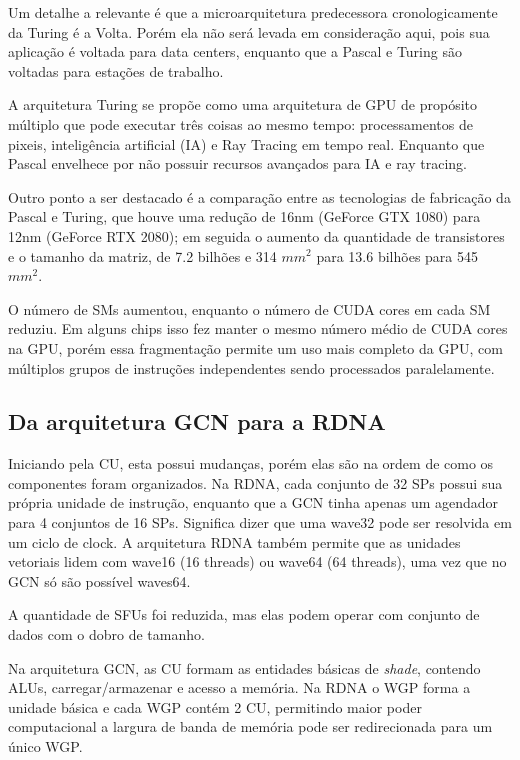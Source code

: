 \documentclass[letterpaper, 10 pt, conference]{ieeeconf}  %
\begin{document}
Um detalhe a relevante é que a microarquitetura predecessora cronologicamente da Turing é a Volta. Porém ela não será levada em consideração aqui, pois sua aplicação é voltada para data centers, enquanto que a Pascal e Turing são voltadas para estações de trabalho.

A arquitetura Turing se propõe como uma arquitetura de GPU de propósito múltiplo que pode executar três coisas ao mesmo tempo: processamentos de pixeis, inteligência artificial (IA) e Ray Tracing em tempo real. Enquanto que Pascal envelhece por não possuir recursos avançados para IA e ray tracing.

Outro ponto a ser destacado é a comparação entre as tecnologias de fabricação da Pascal e Turing, que houve uma redução de 16nm (GeForce GTX 1080) para 12nm (GeForce RTX 2080); em seguida o aumento da quantidade de transistores e o tamanho da matriz, de 7.2 bilhões e 314 $mm^2$ para 13.6 bilhões para 545 $mm^2$.

O número de SMs aumentou, enquanto o número de CUDA cores em cada SM reduziu. Em alguns chips isso fez manter o mesmo número médio de CUDA cores na GPU, porém essa fragmentação permite um uso mais completo da GPU, com múltiplos grupos de instruções independentes sendo processados paralelamente.


\subsection{Da arquitetura GCN para a RDNA}

Iniciando pela CU, esta possui mudanças, porém elas são na ordem de como os componentes foram organizados. Na RDNA, cada conjunto de 32 SPs possui sua própria unidade de instrução, enquanto que a GCN tinha apenas um agendador para 4 conjuntos de 16 SPs. Significa dizer que uma wave32 pode ser resolvida em um ciclo de clock. A arquitetura RDNA também permite que as unidades vetoriais lidem com wave16 (16 threads) ou wave64 (64 threads), uma vez que no GCN só são possível waves64. 

A quantidade de SFUs foi reduzida, mas elas podem operar com conjunto de dados com o dobro de tamanho.

Na arquitetura GCN, as CU formam as entidades básicas de \textit{shade}, contendo ALUs, carregar/armazenar e acesso a memória. Na RDNA o WGP forma a unidade básica e cada WGP contém 2 CU, permitindo maior poder computacional a largura de banda de memória pode ser redirecionada para um único WGP. 
\end{document}
